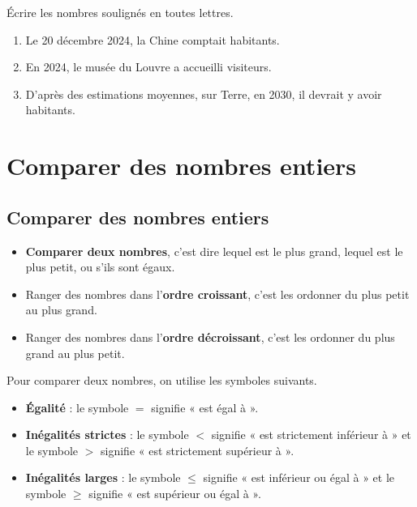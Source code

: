 \documentclass[a4paper]{book}
\begin{document}
    \begin{exemple}
        Écrire les nombres soulignés en toutes lettres.

        \begin{enumerate}
            \item Le 20 décembre 2024, la Chine comptait \underline{} habitants.

            \points[38]

            \item En 2024, le musée du Louvre a accueilli \underline{} visiteurs.

            \points[38]

            \item D'après des estimations moyennes, sur Terre, en 2030, il devrait y avoir \underline{} habitants.

            \points[38]
        \end{enumerate}
    \end{exemple}


\section{Comparer des nombres entiers}
\subsection{Comparer des nombres entiers}

    \begin{definition}[Comparer]
        \begin{itemize}
            \item \textbf{Comparer deux nombres}, c'est dire lequel est le plus grand, lequel est le plus petit, ou s'ils sont égaux.

            \item Ranger des nombres dans l'\textbf{ordre croissant}, c'est les ordonner du plus petit au plus grand.

            \item Ranger des nombres dans l'\textbf{ordre décroissant}, c'est les ordonner du plus grand au plus petit.
        \end{itemize}
    \end{definition}


    \begin{remarque}
        Pour comparer deux nombres, on utilise les symboles suivants.

        \begin{itemize}
            \item \textbf{Égalité} : le symbole \( = \) signifie « est égal à ».
            \item \textbf{Inégalités strictes} : le symbole \( < \) signifie « est strictement inférieur à » et le symbole \( > \) signifie « est strictement supérieur à ».
            \item \textbf{Inégalités larges} : le symbole \( \leq \) signifie « est inférieur ou égal à » et le symbole \( \geq \) signifie « est supérieur ou égal à ».
        \end{itemize}
    \end{remarque}
\end{document}
